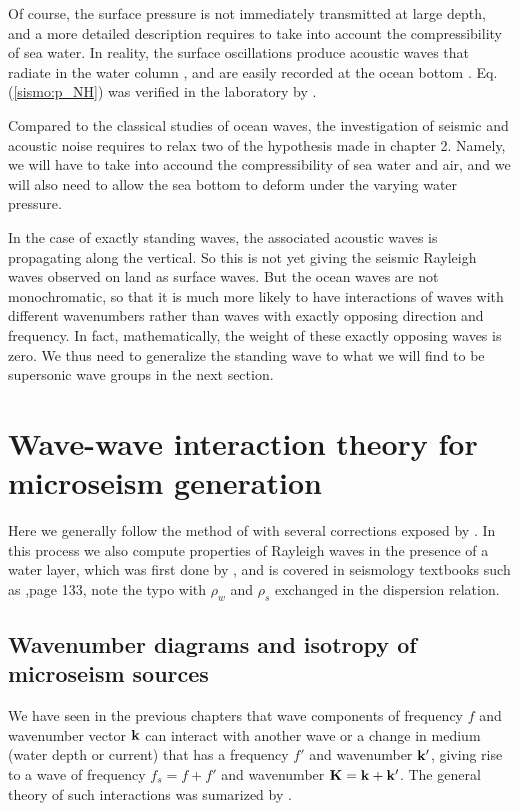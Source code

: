 Of course, the surface pressure is not immediately transmitted at large depth, and a more detailed description 
requires to take into account the compressibility of sea water. In reality, the surface oscillations produce acoustic 
waves that radiate in the water column \citep{Longuet-Higgins1950}, and are easily recorded at the ocean bottom \citep{Farrell&Munk2008}. 
Eq. (\ref{sismo:p_NH}) was verified in the laboratory by  \cite{Cooper&Longuet-Higgins1951}. 

Compared to the classical studies of ocean waves, the investigation of seismic and acoustic noise requires to relax two of the hypothesis made in chapter 2. Namely, 
we will have to take into accound the compressibility of sea water and air, and we will also need to allow the sea bottom to deform under the varying water pressure. 

In the case of exactly standing waves, the associated acoustic waves is propagating along the vertical. So this is not yet giving the seismic Rayleigh waves observed on land as surface waves. But the ocean waves are not monochromatic, so that it is much more likely to have interactions of waves with different wavenumbers rather than waves  with exactly opposing direction and frequency.  In fact, mathematically, the weight of these exactly opposing waves is zero. We thus need to generalize the standing wave to what we will find to be supersonic wave groups in the next section. 


\section{Wave-wave interaction theory for microseism generation}
Here we generally follow the method of \cite{Hasselmann1963c} with several corrections exposed by \cite{Ardhuin&Herbers2013}. 
In this process we also compute properties of Rayleigh waves in the presence of a water layer, which was first done by 
\cite{Stoneley1926}, and is covered in seismology textbooks such as \cite{Lay&Wallace1995},page 133, note the typo with  $\rho_w$ and $\rho_s$ exchanged in the dispersion relation.



\subsection{Wavenumber diagrams and isotropy of microseism sources}
We have seen in the previous chapters that wave components of frequency $f$ and wavenumber vector $\mathbf{k}$ can 
interact with another wave or a change in medium (water depth or current) that has a frequency $f'$ and wavenumber $\mathbf{k^{\prime}}$, giving rise 
to a wave of frequency $f_s=f+f'$ and wavenumber $\mathbf{K}=\mathbf{k}+\mathbf{k^{\prime}}$. The general theory of such interactions was sumarized by \cite{Hasselmann1966}. %

